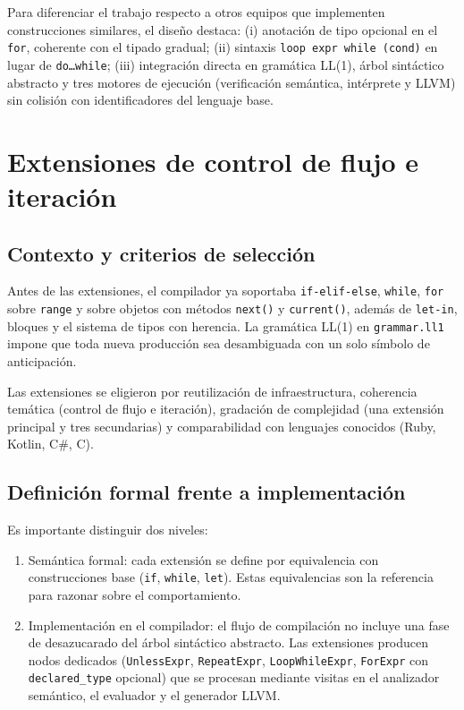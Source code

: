 \documentclass[11pt,a4paper]{article}
\begin{document}
Para diferenciar el trabajo respecto a otros equipos que implementen construcciones similares, el diseño destaca: (i) anotación de tipo opcional en el \texttt{for}, coherente con el tipado gradual; (ii) sintaxis \texttt{loop expr while (cond)} en lugar de \texttt{do\ldots while}; (iii) integración directa en gramática LL(1), árbol sintáctico abstracto y tres motores de ejecución (verificación semántica, intérprete y LLVM) sin colisión con identificadores del lenguaje base.

\section{Extensiones de control de flujo e iteración}

\subsection{Contexto y criterios de selección}

Antes de las extensiones, el compilador ya soportaba \texttt{if-elif-else}, \texttt{while}, \texttt{for} sobre \texttt{range} y sobre objetos con métodos \texttt{next()} y \texttt{current()}, además de \texttt{let-in}, bloques y el sistema de tipos con herencia. La gramática LL(1) en \texttt{grammar.ll1} impone que toda nueva producción sea desambiguada con un solo símbolo de anticipación.

Las extensiones se eligieron por reutilización de infraestructura, coherencia temática (control de flujo e iteración), gradación de complejidad (una extensión principal y tres secundarias) y comparabilidad con lenguajes conocidos (Ruby, Kotlin, C\#, C).

\subsection{Definición formal frente a implementación}

Es importante distinguir dos niveles:

\begin{enumerate}
  \item Semántica formal: cada extensión se define por equivalencia con construcciones base (\texttt{if}, \texttt{while}, \texttt{let}). Estas equivalencias son la referencia para razonar sobre el comportamiento.
  \item Implementación en el compilador: el flujo de compilación no incluye una fase de desazucarado del árbol sintáctico abstracto. Las extensiones producen nodos dedicados (\texttt{UnlessExpr}, \texttt{RepeatExpr}, \texttt{LoopWhileExpr}, \texttt{ForExpr} con \texttt{declared\_type} opcional) que se procesan mediante visitas en el analizador semántico, el evaluador y el generador LLVM.
\end{enumerate}
\end{document}
